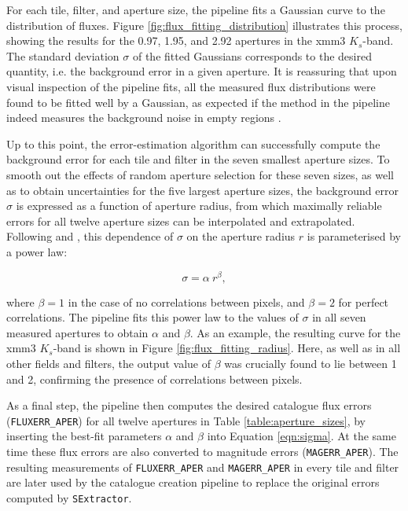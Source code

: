 For each tile, filter, and aperture size, the pipeline fits a Gaussian curve to the distribution of fluxes. Figure \ref{fig:flux_fitting_distribution} illustrates this process, showing the results for the 0.97, 1.95, and \SI{2.92}{\arcsec} apertures in the xmm3 $K_{s}$-band. The standard deviation $\sigma$ of the fitted Gaussians corresponds to the desired quantity, i.e. the background error in a given aperture. It is reassuring that upon visual inspection of the pipeline fits, all the measured flux distributions were found to be fitted well by a Gaussian, as expected if the method in the \DESVIDEO pipeline indeed measures the background noise in empty regions \citep{2003AJ....125.1107L,2006ApJS..162....1G}. \par  


Up to this point, the error-estimation algorithm can successfully compute the background error for each tile and filter in the seven smallest aperture sizes. To smooth out the effects of random aperture selection for these seven sizes, as well as to obtain uncertainties for the five largest aperture sizes, the background error $\sigma$ is expressed as a function of aperture radius, from which  maximally reliable errors for all twelve aperture sizes can be interpolated and extrapolated.  Following \cite{2006ApJS..162....1G} and \cite{2011ApJ...735...86W}, this dependence of $\sigma$ on the aperture radius $r$ is parameterised by a power law: 

\begin{equation}
\sigma = \alpha \ r^{\beta}, \label{eqn:sigma}
\end{equation}

\noindent where $\beta=1$ in the case of no correlations between pixels, and  $\beta=2$ for perfect correlations. The pipeline fits this power law to the values of $\sigma$ in all seven measured apertures to obtain $\alpha$ and $\beta$. As an example, the resulting curve for the xmm3 $K_{s}$-band is shown in Figure \ref{fig:flux_fitting_radius}. Here, as well as in all other fields and filters, the output value of $\beta$ was crucially found to lie between 1 and 2, confirming the presence of correlations between pixels. \par

As a final step, the pipeline then computes the desired \DESVIDEO catalogue flux errors (\texttt{FLUXERR\_APER}) for all twelve apertures in Table \ref{table:aperture_sizes}, by inserting the best-fit parameters $\alpha$ and $\beta$ into Equation \ref{eqn:sigma}. At the same time these flux errors are also converted to magnitude errors (\texttt{MAGERR\_APER}). The resulting measurements of \texttt{FLUXERR\_APER} and \texttt{MAGERR\_APER} in every tile and filter are later used by the \DESVIDEO catalogue creation pipeline to replace the original errors computed by \texttt{SExtractor}.  \par

